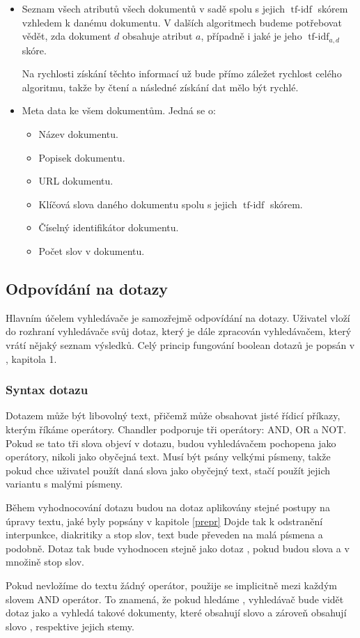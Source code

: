 \documentclass[12pt]{article}
\newcommand{\name}{Chandler}
\newcommand{\ssection}[1]{\subsection{#1}}
\newcommand{\sssection}[1]{\subsubsection{#1}}
\DeclareMathOperator{\tfidf}{tf-idf}
\begin{document}
\begin{itemize}
\item Seznam všech atributů všech dokumentů v sadě spolu s jejich $\tfidf$ skórem vzhledem k danému dokumentu. V dalších algoritmech budeme potřebovat vědět, zda dokument $d$ obsahuje atribut $a$, případně i jaké je jeho $\tfidf_{a, d}$ skóre. 

Na rychlosti získání těchto informací už bude přímo záležet rychlost celého algoritmu, takže by čtení a následné získání dat mělo být rychlé. 

\item Meta data ke všem dokumentům. Jedná se o:
	\begin{itemize}
	\item Název dokumentu. 
	\item Popisek dokumentu.
	\item URL dokumentu. 
	\item Klíčová slova daného dokumentu spolu s jejich $\tfidf$ skórem. 
	\item Číselný identifikátor dokumentu.
	\item Počet slov v dokumentu. 
	\end{itemize}
\end{itemize}


\ssection{Odpovídání na dotazy}
Hlavním účelem vyhledávače je samozřejmě odpovídání na dotazy. Uživatel vloží do rozhraní vyhledávače svůj dotaz, který je dále zpracován vyhledávačem, který vrátí nějaký seznam výsledků. Celý princip fungování boolean dotazů je popsán v \cite{introir}, kapitola 1. 

\sssection{Syntax dotazu}
Dotazem může být libovolný text, přičemž může obsahovat jisté řídicí příkazy, kterým říkáme operátory. \name{} podporuje tři operátory: AND, OR a NOT. Pokud se tato tři slova objeví v dotazu, budou vyhledávačem pochopena jako operátory, nikoli jako obyčejná text. Musí být psány velkými písmeny, takže pokud chce uživatel použít daná slova jako obyčejný text, stačí použít jejich variantu s malými písmeny. 

Během vyhodnocování dotazu budou na dotaz aplikovány stejné postupy na úpravy textu, jaké byly popsány v kapitole \ref{prepr} Dojde tak k odstranění interpunkce, diakritiky a stop slov, text bude převeden na malá písmena a podobně. Dotaz  tak bude vyhodnocen stejně jako dotaz , pokud budou slova  a  v množině stop slov. 

Pokud nevložíme do textu žádný operátor, použije se implicitně mezi každým slovem AND operátor. To znamená, že pokud hledáme , vyhledávač bude vidět dotaz jako  a vyhledá takové dokumenty, které obsahují slovo  a zároveň obsahují slovo , respektive jejich stemy. 
\end{document}
